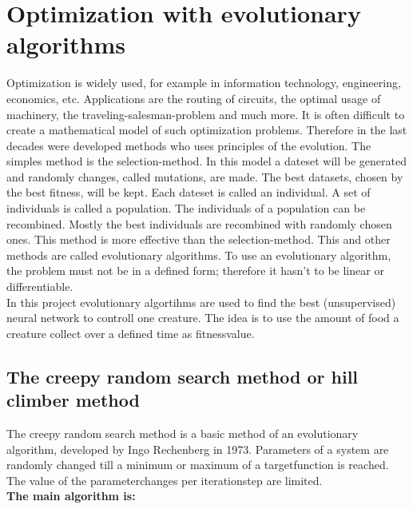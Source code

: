 \documentclass[10pt,a4paper,DIV=11]{scrreprt}
\begin{document}
\chapter{Optimization with evolutionary algorithms}
Optimization is widely used, for example in information technology, engineering,
economics, etc. Applications are the routing of circuits, the optimal usage of machinery,
the traveling-salesman-problem and much more. It is often difficult to create a mathematical
model of such optimization problems. Therefore in the last decades were developed methods who
uses principles of the evolution.
The simples method is the selection-method. In this model a dateset will be generated and randomly
changes, called mutations, are made. The best datasets, chosen by the best fitness, will be kept.
Each dateset is called an individual. A set of individuals is called a population. The individuals
of a population can be recombined. Mostly the best individuals are recombined with randomly chosen
ones. This method is more effective than the selection-method. This and other methods are  called
evolutionary algorithms. To use an evolutionary algorithm, the problem must not be in a defined form;
therefore it hasn't to be linear or differentiable. \\

In this project evolutionary algortihms are used to find the best 
(unsupervised) neural network to controll one creature. The idea is to use the amount of food a creature collect over a defined time as fitnessvalue.

\section{The creepy random search method or hill climber method}
The creepy random search method is a basic method of an evolutionary algorithm, developed by Ingo Rechenberg in 1973. %
Parameters of a system are randomly changed till a minimum or maximum of a targetfunction is reached. The value of the parameterchanges per iterationstep are limited. \\

\textbf{The main algorithm is:}

 \\
\end{document}
